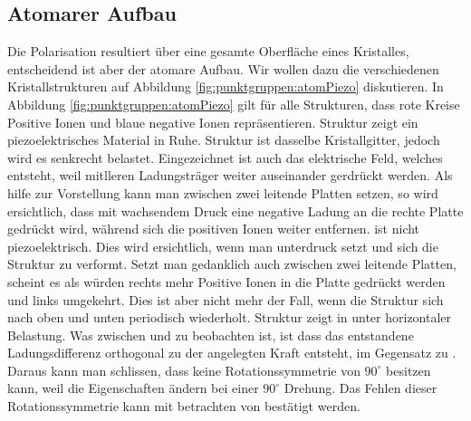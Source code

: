 \subsection{Atomarer Aufbau}
Die Polarisation resultiert über eine gesamte Oberfläche eines Kristalles, entscheidend ist aber der atomare Aufbau.
Wir wollen dazu die verschiedenen Kristallstrukturen auf Abbildung \ref{fig:punktgruppen:atomPiezo} diskutieren.
In Abbildung \ref{fig:punktgruppen:atomPiezo} gilt für alle Strukturen, dass rote Kreise Positive Ionen und blaue negative Ionen repräsentieren. 
Struktur  zeigt ein piezoelektrisches Material in Ruhe. 
Struktur  ist dasselbe Kristallgitter, jedoch wird es senkrecht belastet. 
Eingezeichnet ist auch das elektrische Feld, welches entsteht, weil mitlleren Ladungsträger weiter auseinander gerdrückt werden.
Als hilfe zur Vorstellung kann man  zwischen zwei leitende Platten setzen, so wird ersichtlich, 
dass mit wachsendem Druck eine negative Ladung an die rechte Platte gedrückt wird, während sich die positiven Ionen weiter entfernen. 
 ist nicht piezoelektrisch.
Dies wird ersichtlich, wenn man  unterdruck setzt und sich die Struktur zu  verformt.
Setzt man  gedanklich auch zwischen zwei leitende Platten, 
scheint es als würden rechts mehr Positive Ionen in die Platte gedrückt werden und links umgekehrt.
Dies ist aber nicht mehr der Fall, wenn die Struktur sich nach oben und unten periodisch wiederholt.
Struktur  zeigt  in unter horizontaler Belastung. 
Was zwischen  und  zu beobachten ist, 
ist dass das entstandene Ladungsdifferenz orthogonal zu der angelegten Kraft entsteht, 
im Gegensatz zu .
Daraus kann man schlissen, dass  keine Rotationssymmetrie von $90^\circ$ besitzen kann, 
weil die Eigenschaften ändern bei einer $90^\circ$ Drehung. 
Das Fehlen dieser Rotationssymmetrie kann mit betrachten von  bestätigt werden. 

